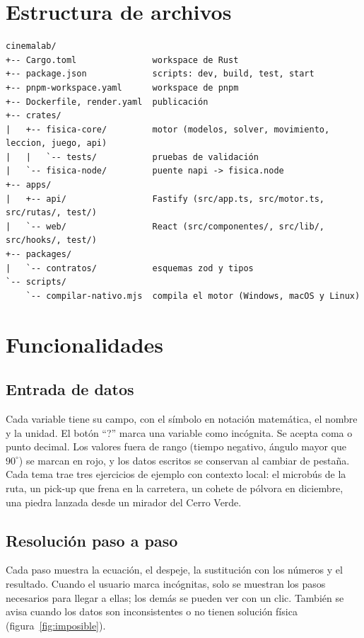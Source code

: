 \documentclass[11pt,letterpaper]{article}
\begin{document}
\section{Estructura de archivos}

\begin{lstlisting}[caption={Estructura del repositorio.}]
cinemalab/
+-- Cargo.toml               workspace de Rust
+-- package.json             scripts: dev, build, test, start
+-- pnpm-workspace.yaml      workspace de pnpm
+-- Dockerfile, render.yaml  publicación
+-- crates/
|   +-- fisica-core/         motor (modelos, solver, movimiento, leccion, juego, api)
|   |   `-- tests/           pruebas de validación
|   `-- fisica-node/         puente napi -> fisica.node
+-- apps/
|   +-- api/                 Fastify (src/app.ts, src/motor.ts, src/rutas/, test/)
|   `-- web/                 React (src/componentes/, src/lib/, src/hooks/, test/)
+-- packages/
|   `-- contratos/           esquemas zod y tipos
`-- scripts/
    `-- compilar-nativo.mjs  compila el motor (Windows, macOS y Linux)
\end{lstlisting}

\section{Funcionalidades}

\subsection{Entrada de datos}

Cada variable tiene su campo, con el símbolo en notación matemática, el nombre y la unidad. El botón ``?'' marca una variable como incógnita. Se acepta coma o punto decimal. Los valores fuera de rango (tiempo negativo, ángulo mayor que $90^\circ$) se marcan en rojo, y los datos escritos se conservan al cambiar de pestaña. Cada tema trae tres ejercicios de ejemplo con contexto local: el microbús de la ruta, un pick-up que frena en la carretera, un cohete de pólvora en diciembre, una piedra lanzada desde un mirador del Cerro Verde.

\subsection{Resolución paso a paso}

Cada paso muestra la ecuación, el despeje, la sustitución con los números y el resultado. Cuando el usuario marca incógnitas, solo se muestran los pasos necesarios para llegar a ellas; los demás se pueden ver con un clic. También se avisa cuando los datos son inconsistentes o no tienen solución física (figura~\ref{fig:imposible}).
\end{document}
